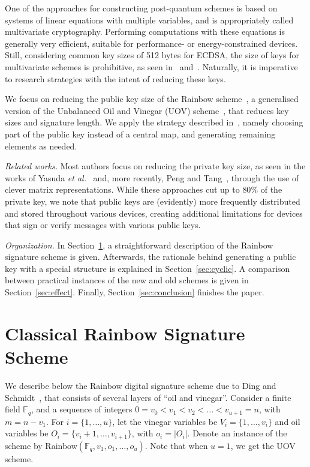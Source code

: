 \documentclass[a4paper, 14pt]{extarticle}
\begin{document}
One of the approaches for constructing post-quantum schemes is based on systems of linear equations with multiple variables, and is appropriately called multivariate cryptography. Performing computations with these equations is generally very efficient, suitable for performance- or energy-constrained devices. Still, considering common key sizes of 512 bytes for ECDSA, the size of keys for multivariate schemes is prohibitive, as seen in~\cite[Table 6.4]{Petzoldt:phd:2013:jul} and~\cite[Table 1]{Ding:article:2017:jul}. Naturally, it is imperative to research strategies with the intent of reducing these keys.

We focus on reducing the public key size of the Rainbow scheme~\cite{Ding:inproc:2005:jun}, a generalised version of the Unbalanced Oil and Vinegar (UOV) scheme~\cite{Kipnis:inproc:1999:apr}, that reduces key sizes and signature length. We apply the strategy described in~\cite[Chapter 7]{Petzoldt:phd:2013:jul}, namely choosing part of the public key instead of a central map, and generating remaining elements as needed.

\emph{Related works.} Most authors focus on reducing the private key size, as seen in the works of Yasuda \emph{et al.}~\cite{Yasuda:inproc:2013:may, Yasuda:inproc:2014:apr, Yasuda:article:2014:sep} and, more recently, Peng and Tang~\cite{Peng:article:2017:jun}, through the use of clever matrix representations. While these approaches cut up to $80\%$ of the private key, we note that public keys are (evidently) more frequently distributed and stored throughout various devices, creating additional limitations for devices that sign or verify messages with various public keys.

\emph{Organization.} In Section~\ref{sec:rainbow}, a straightforward description of the Rainbow signature scheme is given. Afterwards, the rationale behind generating a public key with a special structure is explained in Section~\ref{sec:cyclic}. A comparison between practical instances of the new and old schemes is given in Section~\ref{sec:effect}. Finally, Section~\ref{sec:conclusion} finishes the paper.

\section{Classical Rainbow Signature Scheme}\label{sec:rainbow}

We describe below the Rainbow digital signature scheme due to Ding and Schmidt~\cite{Ding:inproc:2005:jun}, that consists of several layers of ``oil and vinegar''. Consider a finite field $\mathbb{F}_{q}$, and a sequence of integers $0 = v_{0} < v_{1} < v_{2} < \dots < v_{u+1} = n$, with $m = n - v_{1}$. For $i = \{1, \dots, u\}$, let the vinegar variables be $V_{i} = \{1, \dots, v_{i}\}$ and oil variables be $O_{i} = \{v_{i} + 1, \dots, v_{i+1}\}$, with $o_{i} = |O_{i}|$. Denote an instance of the scheme by Rainbow$(\mathbb{F}_{q}, v_{1}, o_{1}, \dots, o_{u})$. Note that when $u = 1$, we get the UOV scheme. 
\end{document}
